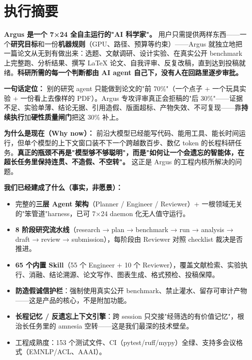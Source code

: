 \documentclass[UTF8,11pt,fontset=none]{ctexart}
\newcommand{\hl}[1]{\textbf{\color{argusnavy}#1}}
\begin{document}
\section{执行摘要}

\hl{Argus 是一个 7×24 全自主运行的"AI 科学家"。} 用户只需提供两样东西——一个\textbf{研究目标}和一份\textbf{机器规则}（GPU、路径、预算等约束）——Argus 就独立地把一篇论文从无到有做出来：选题、文献调研、设计实验、在真实公开 benchmark 上完整跑、分析结果、撰写 LaTeX 论文、自我评审、反复改稿，直到达到投稿就绪。\textbf{科研所需的每一个判断都由 AI agent 自己下，没有人在回路里逐步审批。}

\begin{keybox}
\textbf{一句话定位：} 别的研究 agent 只能做到论文的"前 70\%"（一个点子 + 一个玩具实验 + 一份看上去像样的 PDF）。Argus 专攻评审真正会拒稿的"后 30\%"——证据不足、实验单薄、结论无据、引用造假、版面超标、产物失效、不可复现——靠\textbf{持续执行}加\textbf{硬性质量闸门}把这 30\% 补上。
\end{keybox}

\textbf{为什么是现在（Why now）：} 前沿大模型已经能写代码、能用工具、能长时间运行，但单个模型的上下文窗口装不下一个跨越数百步、数亿 token 的长程科研任务。\textbf{真正的瓶颈不再是"模型够不够聪明"，而是"如何让一个会遗忘的智能体，在超长任务里保持连贯、不造假、不空转"。} 这正是 Argus 的工程内核所解决的问题。

\textbf{我们已经建成了什么（事实，非愿景）：}
\begin{itemize}
  \item 完整的\textbf{三层 Agent 架构}（Planner / Engineer / Reviewer）+ 一根领域无关的"笨管道"harness，已可 7×24 daemon 化无人值守运行。
  \item \textbf{8 阶段研究流水线}（research → plan → benchmark → run → analysis → draft → review → submission），每阶段由 Reviewer 对照 checklist 裁决是否推进。
  \item \textbf{65 个内置 Skill}（55 个 Engineer + 10 个 Reviewer），覆盖文献检索、实验执行、消融、结论溯源、论文写作、图表生成、格式预检、投稿保障。
  \item \textbf{防造假诚信护栏}：强制使用真实公开 benchmark、禁止灌水、留存可审计产物——这是产品的核心，不是附加功能。
  \item \textbf{长程记忆 / 反遗忘上下文引擎}：跨 session 只交接"经筛选的有价值记忆"，根治长任务里的 amnesia 空转——这是我们最深的技术壁垒。
  \item 工程成熟度：153 个测试文件、CI（pytest/ruff/mypy）全绿、支持多会议格式（EMNLP/ACL、AAAI）。
\end{itemize}
\end{document}
